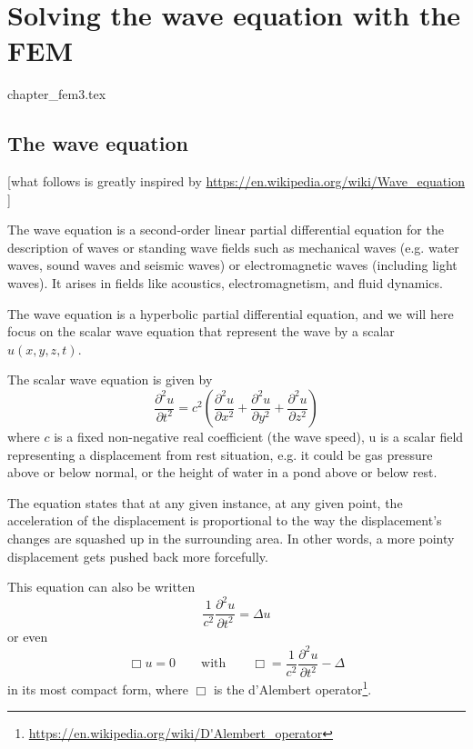 
\chapter{Solving the wave equation with the FEM} \label{fem_waveq} 
\begin{flushright} {\tiny {\color{gray} chapter\_fem3.tex}} \end{flushright}


\section{The wave equation}

[what follows is greatly inspired by \url{https://en.wikipedia.org/wiki/Wave_equation} ]

The wave equation is a second-order linear partial differential equation 
for the description of waves or standing wave fields such as mechanical waves 
(e.g. water waves, sound waves and seismic waves) or electromagnetic waves 
(including light waves). It arises in fields like acoustics, electromagnetism, and fluid dynamics. 

The wave equation is a hyperbolic partial differential equation,
and we will here focus on the scalar wave equation that 
represent the wave by a scalar $u(x,y,z,t)$.

The scalar wave equation is given by
\begin{equation}
\frac{\partial^2 u}{\partial t^2} = c^2 \left(
\frac{\partial^2 u}{\partial x^2} + 
\frac{\partial^2 u}{\partial y^2} + 
\frac{\partial^2 u}{\partial z^2} 
\right)
\end{equation}
where $c$ is a fixed non-negative real coefficient (the wave speed),
u is a scalar field representing a displacement from rest situation, e.g.
it could be gas pressure above or below normal, or the height of water in 
a pond above or below rest.

The equation states that at any given instance, at any given point, 
the acceleration of the displacement is proportional to the way the displacement's 
changes are squashed up in the surrounding area. In other words, a more pointy 
displacement gets pushed back more forcefully. 

This equation can also be written 
\begin{equation}
\frac{1}{c^2} \frac{\partial^2 u}{\partial t^2} = \Delta u
\end{equation}
or even 
\[
\Box u = 0 \qquad \text{with} \qquad \Box= \frac{1}{c^2} \frac{\partial^2 u}{\partial t^2} - \Delta
\]
in its most compact form, where $\Box$ is the d'Alembert 
operator\footnote{\url{https://en.wikipedia.org/wiki/D'Alembert_operator}}.


